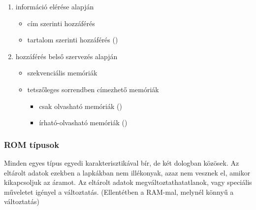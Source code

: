 \documentclass[../main.tex]{subfiles}
\begin{document}
\begin{enumerate}
  \item információ elérése alapján
        \begin{itemize}
          \item cím szerinti hozzáférés

          \item tartalom szerinti hozzáférés ()
        \end{itemize}

  \item hozzáférés belső szervezés alapján
        \begin{itemize}
          \item szekvenciális memóriák

          \item tetszőleges sorrendben címezhető memóriák
                \begin{itemize}
                  \item csak olvasható memóriák ()

                  \item írható-olvasható memóriák ()
                \end{itemize}
        \end{itemize}
\end{enumerate}

\subsubsection*{ROM típusok}

Minden egyes típus egyedi karakterisztikával bír, de két dologban közösek.
Az eltárolt adatok ezekben a lapkákban nem illékonyak, azaz nem vesznek el,
amikor kikapcsoljuk az áramot. Az eltárolt adatok megváltoztathatatlanok,
vagy speciális műveletet igényel a változtatás.
(Ellentétben a RAM-mal, melynél könnyű a változtatás)
\end{document}
